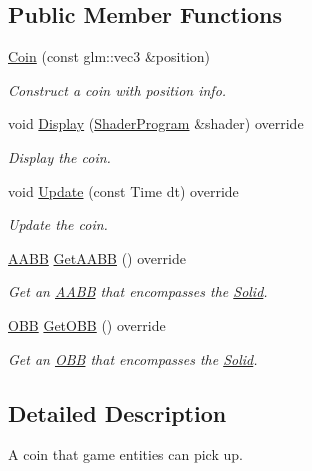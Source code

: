 \subsection*{Public Member Functions}
\begin{DoxyCompactItemize}
\item 
\hyperlink{class_f_l_i_g_h_t_1_1_coin_aef06dda1135461e27bd83a48fa5c02ca}{Coin} (const glm\+::vec3 \&position)
\begin{DoxyCompactList}\small\item\em Construct a coin with position info. \end{DoxyCompactList}\item 
void \hyperlink{class_f_l_i_g_h_t_1_1_coin_a58efad82df5912b37de5084b9575c59d}{Display} (\hyperlink{class_f_l_i_g_h_t_1_1_shader_program}{Shader\+Program} \&shader) override
\begin{DoxyCompactList}\small\item\em Display the coin. \end{DoxyCompactList}\item 
void \hyperlink{class_f_l_i_g_h_t_1_1_coin_a22a213738cf0e29a32b094cb7695e7c0}{Update} (const Time dt) override
\begin{DoxyCompactList}\small\item\em Update the coin. \end{DoxyCompactList}\item 
\hyperlink{class_f_l_i_g_h_t_1_1_a_a_b_b}{A\+A\+BB} \hyperlink{class_f_l_i_g_h_t_1_1_coin_a89d040ae510e248428277d8afed19515}{Get\+A\+A\+BB} () override
\begin{DoxyCompactList}\small\item\em Get an \hyperlink{class_f_l_i_g_h_t_1_1_a_a_b_b}{A\+A\+BB} that encompasses the \hyperlink{class_f_l_i_g_h_t_1_1_solid}{Solid}. \end{DoxyCompactList}\item 
\hyperlink{class_f_l_i_g_h_t_1_1_o_b_b}{O\+BB} \hyperlink{class_f_l_i_g_h_t_1_1_coin_a7f4bf6128f703b6501a2596e8a562eea}{Get\+O\+BB} () override
\begin{DoxyCompactList}\small\item\em Get an \hyperlink{class_f_l_i_g_h_t_1_1_o_b_b}{O\+BB} that encompasses the \hyperlink{class_f_l_i_g_h_t_1_1_solid}{Solid}. \end{DoxyCompactList}\end{DoxyCompactItemize}


\subsection{Detailed Description}
A coin that game entities can pick up. 

